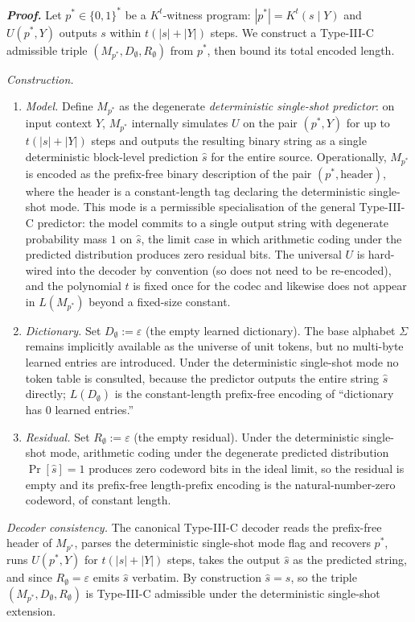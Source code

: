 \documentclass[
]{article}
\begin{document}
\emph{\textbf{Proof.}} Let $p^* \in \{0,1\}^*$ be a $K^t$-witness
program: $|p^*| = K^t(s \mid Y)$ and $U(p^*, Y)$ outputs $s$ within
$t(|s|+|Y|)$ steps. We construct a Type-III-C admissible triple
$(M_{p^*}, D_\emptyset, R_\emptyset)$ from $p^*$, then bound its
total encoded length.

\emph{Construction.}
\begin{enumerate}
\item \emph{Model.} Define $M_{p^*}$ as the degenerate
\emph{deterministic single-shot predictor}: on input context $Y$,
$M_{p^*}$ internally simulates $U$ on the pair $(p^*, Y)$ for up to
$t(|s|+|Y|)$ steps and outputs the resulting binary string as a
single deterministic block-level prediction $\hat{s}$ for the entire
source. Operationally, $M_{p^*}$ is encoded as the prefix-free binary
description of the pair $(p^*,\text{header})$, where the header is a
constant-length tag declaring the deterministic single-shot mode.
This mode is a permissible specialisation of the general Type-III-C
predictor: the model commits to a single output string with
degenerate probability mass $1$ on $\hat{s}$, the limit case in which
arithmetic coding under the predicted distribution produces zero
residual bits. The universal $U$ is hard-wired into the decoder by
convention (so does not need to be re-encoded), and the polynomial
$t$ is fixed once for the codec and likewise does not appear in
$L(M_{p^*})$ beyond a fixed-size constant.
\item \emph{Dictionary.} Set $D_\emptyset := \varepsilon$ (the empty
learned dictionary). The base alphabet $\Sigma$ remains implicitly
available as the universe of unit tokens, but no multi-byte learned
entries are introduced. Under the deterministic single-shot mode no
token table is consulted, because the predictor outputs the entire
string $\hat{s}$ directly; $L(D_\emptyset)$ is the constant-length
prefix-free encoding of ``dictionary has 0 learned entries.''
\item \emph{Residual.} Set $R_\emptyset := \varepsilon$ (the empty
residual). Under the deterministic single-shot mode, arithmetic
coding under the degenerate predicted distribution
$\Pr[\hat{s}] = 1$ produces zero codeword bits in the ideal limit,
so the residual is empty and its prefix-free length-prefix encoding
is the natural-number-zero codeword, of constant length.
\end{enumerate}

\emph{Decoder consistency.} The canonical Type-III-C decoder reads
the prefix-free header of $M_{p^*}$, parses the deterministic
single-shot mode flag and recovers $p^*$, runs $U(p^*, Y)$ for
$t(|s|+|Y|)$ steps, takes the output $\hat{s}$ as the predicted
string, and since $R_\emptyset = \varepsilon$ emits $\hat{s}$
verbatim. By construction $\hat{s} = s$, so the triple
$(M_{p^*}, D_\emptyset, R_\emptyset)$ is Type-III-C admissible under
the deterministic single-shot extension.
\end{document}

